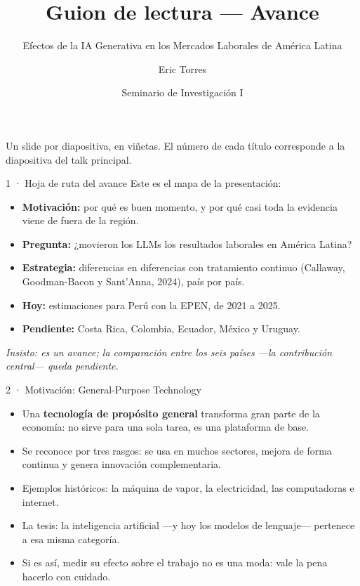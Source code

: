 \documentclass[11pt,aspectratio=169]{beamer}
\title{Guion de lectura — Avance}
\subtitle{Efectos de la IA Generativa en los Mercados Laborales de América Latina}
\author{Eric Torres}
\date{Seminario de Investigación I}
\begin{document}
\begin{frame}[plain]
  \titlepage
  \vfill
  {\footnotesize Un slide por diapositiva, en viñetas. El número de cada título
  corresponde a la diapositiva del talk principal.}
\end{frame}

\begin{frame}{1 · Hoja de ruta del avance}
Este es el mapa de la presentación:
\begin{itemize}
  \item \textbf{Motivación:} por qué es buen momento, y por qué casi toda la evidencia viene de fuera de la región.
  \item \textbf{Pregunta:} ¿movieron los LLMs los resultados laborales en América Latina?
  \item \textbf{Estrategia:} diferencias en diferencias con tratamiento continuo (Callaway, Goodman-Bacon y Sant'Anna, 2024), país por país.
  \item \textbf{Hoy:} estimaciones para Perú con la EPEN, de 2021 a 2025.
  \item \textbf{Pendiente:} Costa Rica, Colombia, Ecuador, México y Uruguay.
\end{itemize}
\textit{Insisto: es un avance; la comparación entre los seis países —la contribución central— queda pendiente.}
\end{frame}

\begin{frame}{2 · Motivación: General-Purpose Technology}
\begin{itemize}
  \item Una \textbf{tecnología de propósito general} transforma gran parte de la economía: no sirve para una sola tarea, es una plataforma de base.
  \item Se reconoce por tres rasgos: se usa en muchos sectores, mejora de forma continua y genera innovación complementaria.
  \item Ejemplos históricos: la máquina de vapor, la electricidad, las computadoras e internet.
  \item La tesis: la inteligencia artificial —y hoy los modelos de lenguaje— pertenece a esa misma categoría.
  \item Si es así, medir su efecto sobre el trabajo no es una moda: vale la pena hacerlo con cuidado.
\end{itemize}
\end{frame}
\end{document}
